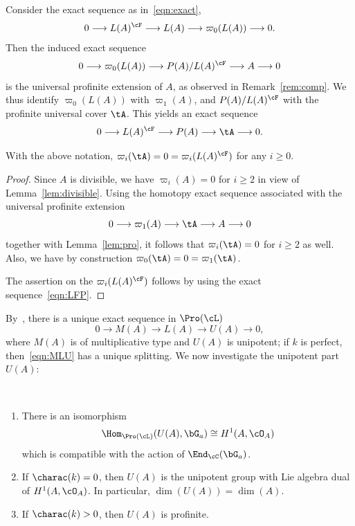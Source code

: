Consider the exact sequence as in~\eqref{eqn:exact},
\[
0 \longrightarrow L(A)^{\cF} \longrightarrow L(A) \longrightarrow \varpi_0(L(A)) \longrightarrow 0.
\]
Then the induced exact sequence
\[
0 \longrightarrow \varpi_0(L(A)) \longrightarrow P(A)/L(A)^{\cF} \longrightarrow A \longrightarrow 0
\]
is the universal profinite extension of $A$, as observed in Remark~\ref{rem:comp}. We thus identify $\varpi_0(L(A))$ with $\varpi_1(A)$, and $P(A)/L(A)^{\cF}$ with the profinite universal cover $\tA$. This yields an exact sequence
\begin{equation}\label{eqn:LFP}
0 \longrightarrow L(A)^{\cF} \longrightarrow P(A) \longrightarrow \tA \longrightarrow 0.
\end{equation}

\begin{lemm}\label{lem:acyclic}
With the above notation, $\varpi_i(\tA) = 0 = \varpi_i(L(A)^{\cF})$ for any $i \geq 0$.
\end{lemm}

\begin{proof}
Since $A$ is divisible, we have $\varpi_i(A) = 0$ for $i \geq 2$ in view of Lemma~\ref{lem:divisible}. Using the homotopy exact sequence associated with the universal profinite extension
\[
0 \longrightarrow \varpi_1(A) \longrightarrow
\tA \longrightarrow A \longrightarrow 0
\]
together with Lemma~\ref{lem:pro}, it follows that $\varpi_i(\tA) = 0$ for $i \geq 2$ as well. Also, we have by construction $\varpi_0(\tA) = 0 = \varpi_1(\tA)$.

The assertion on the $\varpi_i(L(A)^{\cF})$ follows by using the exact sequence~\eqref{eqn:LFP}.
\end{proof}

By~\cite[IV.3.1.1]{DG}, there is a unique exact sequence in $\Pro(\cL)$
\begin{equation}\label{eqn:MLU}
0 \longrightarrow M(A) \longrightarrow L(A) \longrightarrow U(A) \longrightarrow 0,
\end{equation}
where $M(A)$ is of multiplicative type and $U(A)$ is unipotent; if $k$ is perfect, then~\eqref{eqn:MLU} has a unique splitting. We now investigate the unipotent part $U(A)$:

\begin{lemm}\label{lem:U(A)}\ 
\begin{enumerate}\romanenumi
\item \label{3.8.1} There is an isomorphism
\[
\Hom_{\Pro(\cL)}(U(A),\bG_a) \cong H^1(A,\cO_A)
\]
which is compatible with the action of $\End_{\cC}(\bG_a)$.
\item \label{3.8.2} If $\charac(k) = 0$, then $U(A)$ is the unipotent group with Lie algebra dual of $H^1(A,\cO_A)$. In particular, $\dim(U(A)) = \dim(A)$.
\item \label{3.8.3} If $\charac(k) > 0$, then $U(A)$ is profinite.
\end{enumerate}
\end{lemm}

